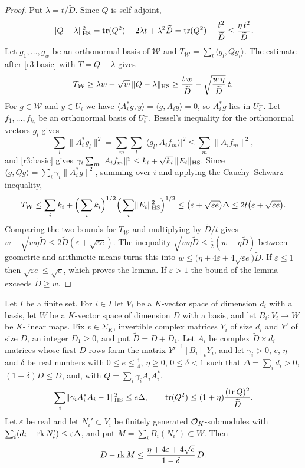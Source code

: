 \begin{proof}
Put $\lambda=t/\widetilde D$. Since $Q$ is self-adjoint,
\[
\lVert Q-\lambda\rVert_{\mathrm{HS}}^2=\operatorname{tr}(Q^2)-2\lambda t+\lambda^2\widetilde D=\operatorname{tr}(Q^2)-\frac{t^2}{\widetilde D}\le\frac{\eta\,t^2}{\widetilde D}.
\]
Let $g_1,\dots,g_w$ be an orthonormal basis of $\mathcal W$ and $T_{\mathcal W}=\sum_l\langle g_l,Qg_l\rangle$. The estimate after \eqref{r3:basic} with $T=Q-\lambda$ gives
\[
T_{\mathcal W}\ge\lambda w-\sqrt w\,\lVert Q-\lambda\rVert_{\mathrm{HS}}\ge\frac{t\,w}{\widetilde D}-\sqrt{\frac{w\,\eta}{\widetilde D}}\;t .
\]
For $g\in\mathcal W$ and $y\in U_i$ we have $\langle A_i^*g,y\rangle=\langle g,A_iy\rangle=0$, so $A_i^*g$ lies in $U_i^\perp$. Let $f_1,\dots,f_{k_i}$ be an orthonormal basis of $U_i^\perp$. Bessel's inequality for the orthonormal vectors $g_l$ gives
\[
\sum_l\lVert A_i^*g_l\rVert^2=\sum_{m}\sum_l\lvert\langle g_l,A_if_m\rangle\rvert^2\le\sum_m\lVert A_if_m\rVert^2,
\]
and \eqref{r3:basic} gives $\gamma_i\sum_m\lVert A_if_m\rVert^2\le k_i+\sqrt{k_i}\,\lVert E_i\rVert_{\mathrm{HS}}$. Since $\langle g,Qg\rangle=\sum_i\gamma_i\lVert A_i^*g\rVert^2$, summing over $i$ and applying the Cauchy--Schwarz inequality,
\[
T_{\mathcal W}\le\sum_ik_i+\Big(\sum_ik_i\Big)^{1/2}\Big(\sum_i\lVert E_i\rVert_{\mathrm{HS}}^2\Big)^{1/2}\le\big(\varepsilon+\sqrt{\varepsilon e}\big)\Delta\le2t\big(\varepsilon+\sqrt{\varepsilon e}\big).
\]
Comparing the two bounds for $T_{\mathcal W}$ and multiplying by $\widetilde D/t$ gives $w-\sqrt{w\eta\widetilde D}\le2\widetilde D(\varepsilon+\sqrt{\varepsilon e})$. The inequality $\sqrt{w\eta\widetilde D}\le\frac12(w+\eta\widetilde D)$ between geometric and arithmetic means turns this into $w\le\big(\eta+4\varepsilon+4\sqrt{\varepsilon e}\big)\widetilde D$. If $\varepsilon\le1$ then $\sqrt{\varepsilon e}\le\sqrt e$, which proves the lemma. If $\varepsilon>1$ the bound of the lemma exceeds $\widetilde D\ge w$.
\end{proof}

\begin{lemma}\label{r3:place}
Let $I$ be a finite set. For $i\in I$ let $V_i$ be a $K$-vector space of dimension $d_i$ with a basis, let $W$ be a $K$-vector space of dimension $D$ with a basis, and let $B_i\colon V_i\to W$ be $K$-linear maps. Fix $v\in\Sigma_K$, invertible complex matrices $Y_i$ of size $d_i$ and $Y'$ of size $D$, an integer $D_1\ge0$, and put $\widetilde D=D+D_1$. Let $A_i$ be complex $\widetilde D\times d_i$ matrices whose first $D$ rows form the matrix $Y'^{-1}[B_i]_vY_i$, and let $\gamma_i>0$, $e$, $\eta$ and $\delta$ be real numbers with $0\le e\le\frac14$, $\eta\ge0$, $0\le\delta<1$ such that $\Delta=\sum_id_i>0$, $(1-\delta)\widetilde D\le D$, and, with $Q=\sum_i\gamma_iA_iA_i^*$,
\[
\sum_i\lVert\gamma_iA_i^*A_i-1\rVert_{\mathrm{HS}}^2\le e\Delta,\qquad\operatorname{tr}(Q^2)\le(1+\eta)\frac{(\operatorname{tr} Q)^2}{\widetilde D}.
\] Let $\varepsilon$ be real and let $N_i'\subset V_i$ be finitely generated $\mathcal O_K$-submodules with $\sum_i(d_i-\operatorname{rk} N_i')\le\varepsilon \Delta$, and put $M=\sum_iB_i(N_i')\subset W$. Then
\[
D-\operatorname{rk} M\le\frac{\eta+4\varepsilon+4\sqrt e}{1-\delta}\,D .
\]
\end{lemma}

